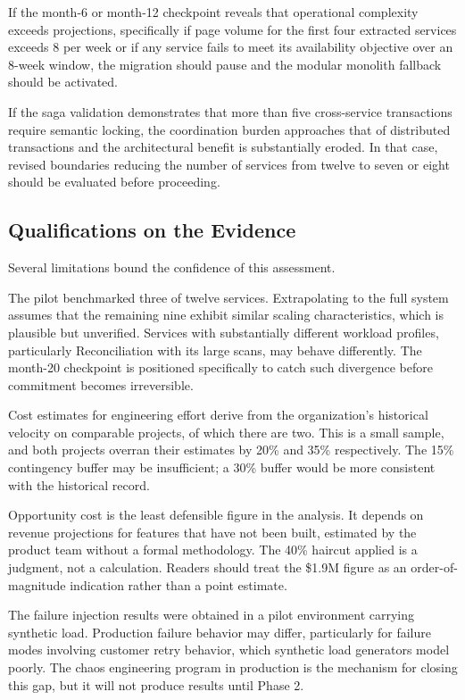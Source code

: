 If the month-6 or month-12 checkpoint reveals that operational complexity exceeds projections, specifically if page volume for the first four extracted services exceeds 8 per week or if any service fails to meet its availability objective over an 8-week window, the migration should pause and the modular monolith fallback should be activated.

If the saga validation demonstrates that more than five cross-service transactions require semantic locking, the coordination burden approaches that of distributed transactions and the architectural benefit is substantially eroded. In that case, revised boundaries reducing the number of services from twelve to seven or eight should be evaluated before proceeding.

\subsection{Qualifications on the Evidence}

Several limitations bound the confidence of this assessment.

The pilot benchmarked three of twelve services. Extrapolating to the full system assumes that the remaining nine exhibit similar scaling characteristics, which is plausible but unverified. Services with substantially different workload profiles, particularly Reconciliation with its large scans, may behave differently. The month-20 checkpoint is positioned specifically to catch such divergence before commitment becomes irreversible.

Cost estimates for engineering effort derive from the organization's historical velocity on comparable projects, of which there are two. This is a small sample, and both projects overran their estimates by 20\% and 35\% respectively. The 15\% contingency buffer may be insufficient; a 30\% buffer would be more consistent with the historical record.

Opportunity cost is the least defensible figure in the analysis. It depends on revenue projections for features that have not been built, estimated by the product team without a formal methodology. The 40\% haircut applied is a judgment, not a calculation. Readers should treat the \$1.9M figure as an order-of-magnitude indication rather than a point estimate.

The failure injection results were obtained in a pilot environment carrying synthetic load. Production failure behavior may differ, particularly for failure modes involving customer retry behavior, which synthetic load generators model poorly. The chaos engineering program in production is the mechanism for closing this gap, but it will not produce results until Phase 2.

